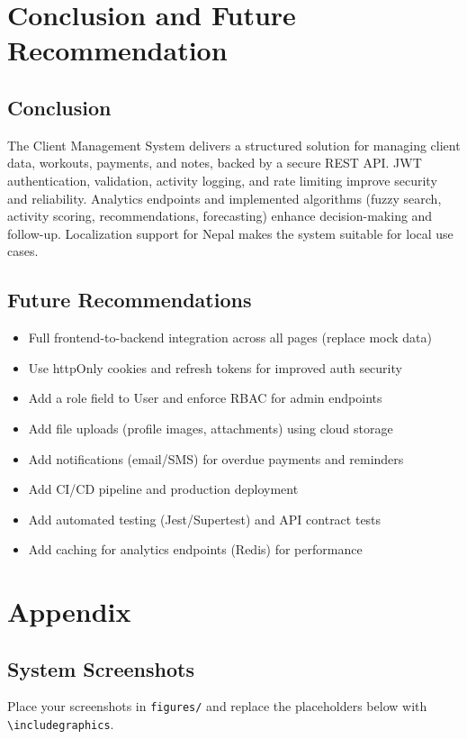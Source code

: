 \documentclass[12pt,a4paper]{report}
\begin{document}
\chapter{Conclusion and Future Recommendation}
\section{Conclusion}
The Client Management System delivers a structured solution for managing client data, workouts, payments, and notes, backed by a secure REST API. JWT authentication, validation, activity logging, and rate limiting improve security and reliability. Analytics endpoints and implemented algorithms (fuzzy search, activity scoring, recommendations, forecasting) enhance decision-making and follow-up. Localization support for Nepal makes the system suitable for local use cases.

\section{Future Recommendations}
\begin{itemize}[leftmargin=*]
  \item Full frontend-to-backend integration across all pages (replace mock data)
  \item Use httpOnly cookies and refresh tokens for improved auth security
  \item Add a role field to User and enforce RBAC for admin endpoints
  \item Add file uploads (profile images, attachments) using cloud storage
  \item Add notifications (email/SMS) for overdue payments and reminders
  \item Add CI/CD pipeline and production deployment
  \item Add automated testing (Jest/Supertest) and API contract tests
  \item Add caching for analytics endpoints (Redis) for performance
\end{itemize}

\appendix
\chapter{Appendix}
\section{System Screenshots}
Place your screenshots in \texttt{figures/} and replace the placeholders below with \texttt{\textbackslash includegraphics}.
\end{document}
